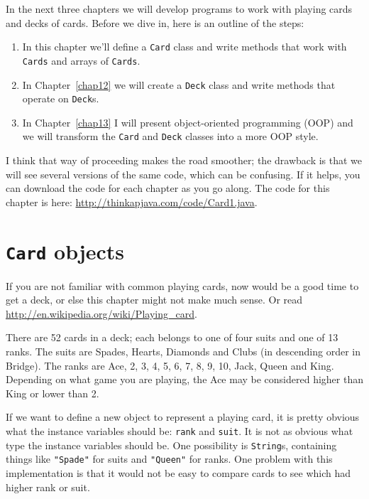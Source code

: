 \documentclass[12pt]{book}
\theoremstyle{exercise}
\begin{document}
In the next three chapters we will develop programs to work with
playing cards and decks of cards.  Before we dive in, here is an
outline of the steps:

\begin{enumerate}

\item In this chapter we'll define a {\tt Card} class and write
methods that work with {\tt Cards} and arrays of {\tt Cards}.

\item In Chapter~\ref{chap12} we will create a {\tt Deck} class
and write methods that operate on {\tt Deck}s.

\item In Chapter~\ref{chap13} I will present object-oriented
programming (OOP) and we will transform the {\tt Card} and {\tt Deck}
classes into a more OOP style.

\end{enumerate}

I think that way of proceeding makes the road smoother; the drawback
is that we will see several versions of the same code, which can
be confusing.  If it helps, you can download the code for each
chapter as you go along.  The code for this chapter is here:
\url{http://thinkapjava.com/code/Card1.java}.


\section{{\tt Card} objects}
\label{card}

If you are not familiar with common playing cards, now would be a good
time to get a deck, or else this chapter might not make much sense.
Or read \url{http://en.wikipedia.org/wiki/Playing_card}.

There are 52 cards in a deck; each belongs to one of four
suits and one of 13 ranks.  The suits are Spades, Hearts, Diamonds and
Clubs (in descending order in Bridge).  The ranks are Ace, 2, 3, 4, 5,
6, 7, 8, 9, 10, Jack, Queen and King.  Depending on what game you are
playing, the Ace may be considered higher than King or lower than 2.


If we want to define a new object to represent a playing card, it is
pretty obvious what the instance variables should be: {\tt rank} and
{\tt suit}.  It is not as obvious what type the instance variables
should be.  One possibility is {\tt String}s, containing things like
{\tt "Spade"} for suits and {\tt "Queen"} for ranks.  One problem with
this implementation is that it would not be easy to compare cards to
see which had higher rank or suit.
\end{document}
